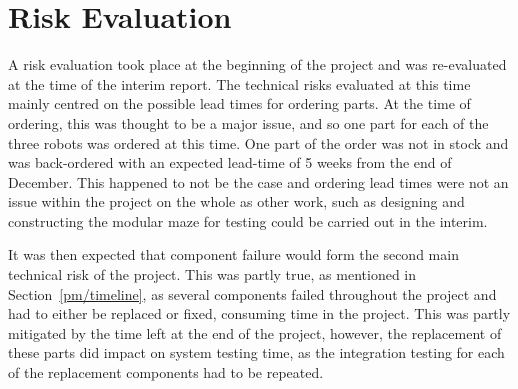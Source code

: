 \section{Risk Evaluation}\label{pm/riskeval}
A risk evaluation took place at the beginning of the project and
was re-evaluated at the time of the interim report. The technical
risks evaluated at this time mainly centred on the possible lead
times for ordering parts. At the time of ordering, this was
thought to be a major issue, and so one part for each of the three
robots was ordered at this time. One part of the order
was not in stock and was back-ordered with an expected
lead-time of 5 weeks from the end of December. This happened to
not be the case and ordering lead times were not an issue within
the project on the whole as other work, such as designing and
constructing the modular maze for testing could be carried out in
the interim.

It was then expected that component failure would form the second
main technical risk of the project. This was partly true, as
mentioned in Section~\ref{pm/timeline}, as several components
failed throughout the project and had to either be replaced or
fixed, consuming time in the project. This was partly mitigated by
the time left at the end of the project, however, the replacement
of these parts did impact on system testing time, as the
integration testing for each of the replacement components had to
be repeated.
